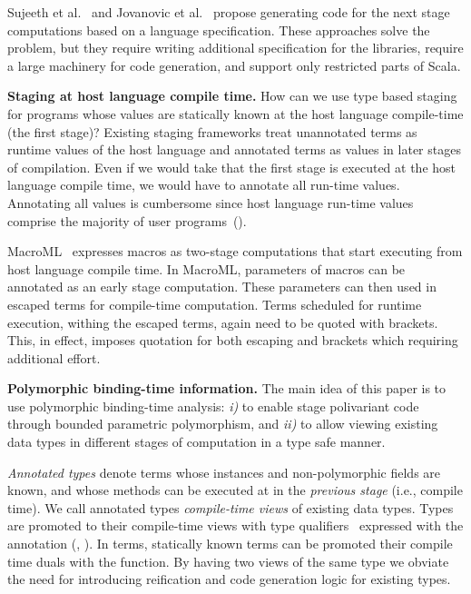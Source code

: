 Sujeeth et al.~\cite{forge} and Jovanovic et al.~\cite{yin-yang}
 propose generating code for the next stage computations based on
 a language specification. These approaches solve the problem,
 but they require writing additional specification for the libraries,
 require a large machinery for code generation,
 and support only restricted parts of Scala.

{\bf Staging at host language compile time.} How can we use type based staging for programs whose values are statically
 known at the host language compile-time (the first stage)? Existing staging frameworks
 treat unannotated terms as runtime values of the host language and annotated terms as
 values in later stages of compilation. Even if we would take that the first stage is executed
 at the host language compile time, we would have to annotate all run-time values.
 Annotating all values is cumbersome since host language run-time values comprise
 the majority of user programs~().


MacroML~\cite{ganz2001macros} expresses macros as two-stage computations that start executing from host language compile time.
 In MacroML, parameters of macros can be annotated as an early stage computation. These parameters
 can then used in escaped terms for compile-time computation. Terms scheduled for runtime execution,
 withing the escaped terms, again need to be quoted with brackets. This,
 in effect, imposes quotation for both escaping and brackets which requiring additional effort.


{\bf Polymorphic binding-time information.} The main idea of this paper is to use polymorphic binding-time analysis:
 \emph{i)} to enable stage polivariant code through bounded parametric polymorphism, and \emph{ii)} to allow viewing existing
 data types in different stages of computation in a type safe manner.

\emph{Annotated types} denote terms whose instances and non-polymorphic fields are known, and
 whose methods can be executed at in the \emph{previous stage} (i.e., compile time). We call annotated types \emph{compile-time views}
 of existing data types. Types are promoted to their compile-time views with type qualifiers~\cite{} expressed with
 the  annotation (\eg, ). In terms, statically known terms can be promoted
 their compile time duals with the  function. By having two views of the same type
 we obviate the need for introducing reification and code generation logic for existing types.

